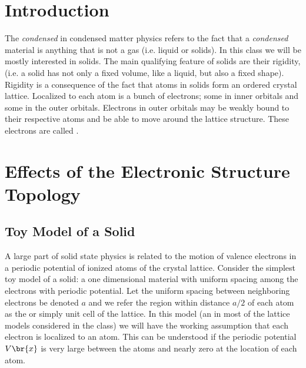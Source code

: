 \documentclass{article}
\begin{document}
\titlePage

\tableOfContents

\disclaimer

\section{Introduction}

The \textit{condensed} in condensed matter physics refers to the fact that a \textit{condensed} material is anything that is not a gas (i.e. liquid or solids). In this class we will be mostly interested in solids. The main qualifying feature of solids are their rigidity, (i.e. a solid has not only a fixed volume, like a liquid, but also a fixed shape). Rigidity is a consequence of the fact that atoms in solids form an ordered crystal lattice. Localized to each atom is a bunch of electrons; some in inner orbitals and some in the outer orbitals. Electrons in outer orbitals may be weakly bound to their respective atoms and be able to move around the lattice structure. These electrons are called .

\section{Effects of the Electronic Structure Topology}
\label{sec:structure_topological}
\subsection{Toy Model of a Solid}
\label{sec:toy_model}

A large part of solid state physics is related to the motion of valence electrons in a periodic potential of ionized atoms of the crystal lattice. Consider the simplest toy model of a solid: a one dimensional material with uniform spacing among the electrons with periodic potential. Let the uniform spacing between neighboring electrons be denoted $a$ and we refer the region within distance $a/2$ of each atom as the  or simply unit cell of the lattice. In this model (an in most of the lattice models considered in the class) we will have the working assumption that each electron is localized to an atom. This can be understood if the periodic potential $V\br{x}$ is very large between the atoms and nearly zero at the location of each atom.
\end{document}
